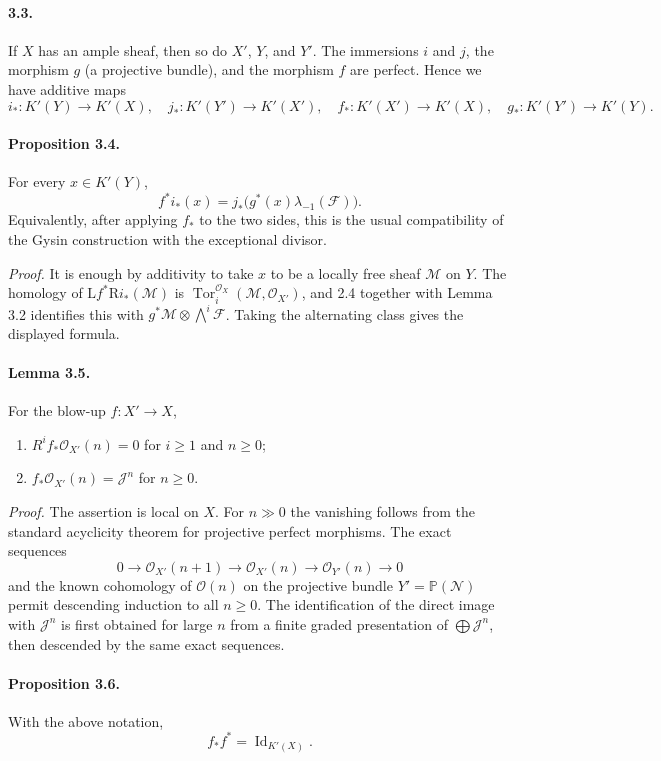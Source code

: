 \documentclass[12pt]{article}
\newcommand{\cO}{\mathcal O}
\newcommand{\cJ}{\mathcal J}
\newcommand{\cM}{\mathcal M}
\newcommand{\uF}{\mathcal F}
\newcommand{\uN}{\mathcal N}
\newcommand{\Tor}{\operatorname{Tor}}
\newcommand{\Id}{\operatorname{Id}}
\newcommand{\RR}{\mathrm R}
\newcommand{\LL}{\mathrm L}
\newcommand{\bbP}{\mathbb P}
\begin{document}
\paragraph{3.3.} If $X$ has an ample sheaf, then so do $X'$, $Y$, and $Y'$. The immersions $i$ and $j$, the morphism $g$ (a projective bundle), and the morphism $f$ are perfect. Hence we have additive maps
\[
i_*:K'(Y)\to K'(X),\quad j_*:K'(Y')\to K'(X'),\quad
f_*:K'(X')\to K'(X),\quad g_*:K'(Y')\to K'(Y).
\]

\paragraph{Proposition 3.4.} For every $x\in K'(Y)$,
\[
f^*i_*(x)=j_*\bigl(g^*(x)\lambda_{-1}(\uF)\bigr).
\]
Equivalently, after applying $f_*$ to the two sides, this is the usual compatibility of the Gysin construction with the exceptional divisor.

\emph{Proof.} It is enough by additivity to take $x$ to be a locally free sheaf $\cM$ on $Y$. The homology of $\LL f^*\RR i_*(\cM)$ is $\Tor_i^{\cO_X}(\cM,\cO_{X'})$, and 2.4 together with Lemma 3.2 identifies this with $g^*\cM\otimes\bigwedge^i\uF$. Taking the alternating class gives the displayed formula.

\paragraph{Lemma 3.5.} For the blow-up $f:X'\to X$,
\begin{enumerate}[label=\roman*)]
\item $R^if_*\cO_{X'}(n)=0$ for $i\geq1$ and $n\geq0$;
\item $f_*\cO_{X'}(n)=\cJ^n$ for $n\geq0$.
\end{enumerate}

\emph{Proof.} The assertion is local on $X$. For $n\gg0$ the vanishing follows from the standard acyclicity theorem for projective perfect morphisms. The exact sequences
\[
0\to\cO_{X'}(n+1)\to\cO_{X'}(n)\to\cO_{Y'}(n)\to0
\]
and the known cohomology of $\cO(n)$ on the projective bundle $Y'=\bbP(\uN)$ permit descending induction to all $n\geq0$. The identification of the direct image with $\cJ^n$ is first obtained for large $n$ from a finite graded presentation of $\bigoplus\cJ^n$, then descended by the same exact sequences.

\paragraph{Proposition 3.6.} With the above notation,
\[
f_*f^*=\Id_{K'(X)}.
\]
\end{document}
